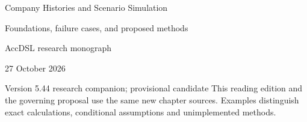 \documentclass[11pt,a4paper]{report}
\begin{document}
\hypersetup{pageanchor=false}
\begin{titlepage}
{\Huge Company Histories and Scenario Simulation\par}
\vspace{12mm}
{\Large Foundations, failure cases, and proposed methods\par}
\vspace{8mm}
AccDSL research monograph\par 27 October 2026\par Version 5.44 research companion; provisional candidate
\vfill
This reading edition and the governing proposal use the same new chapter sources. Examples distinguish exact calculations, conditional assumptions and unimplemented methods.
\end{titlepage}
\hypersetup{pageanchor=true}
\tableofcontents
\clearpage{}


























\clearpage\label{sim:body-end}

\begingroup\raggedright
\endgroup
\end{document}
